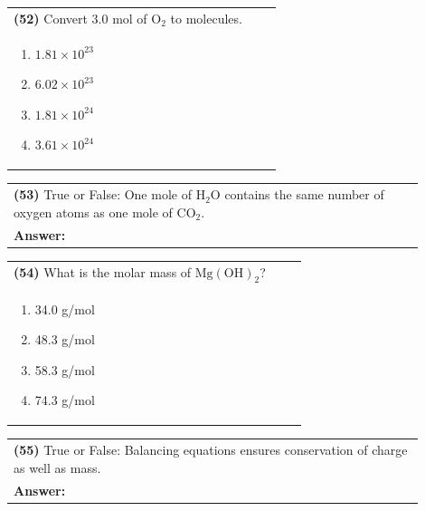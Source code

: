 \documentclass{article}
\begin{document}
\vspace{0.2cm}
\noindent \begin{tabular}{|p{0.9\linewidth}|}
\hline
\vspace{0.2cm}
\textbf{(52)} Convert 3.0 mol of $\mathrm{O_2}$ to molecules.\\
\begin{minipage}[t]{0.85\linewidth}
\begin{enumerate}[label=\alph*.]
\item $1.81\times10^{23}$
\item $6.02\times10^{23}$
\item $1.81\times10^{24}$
\item $3.61\times10^{24}$
\end{enumerate}
\end{minipage}\\
\hline
\end{tabular}
\newpage

\vspace{0.2cm}
\noindent \begin{tabular}{|p{0.9\linewidth}|}
\hline
\vspace{0.2cm}
\textbf{(53)} True or False: One mole of $\mathrm{H_2O}$ contains the same number of oxygen atoms as one mole of $\mathrm{CO_2}$.\\
\textbf{Answer:} \underline{\hspace{2cm}}\\
\hline
\end{tabular}

\vspace{0.2cm}
\noindent \begin{tabular}{|p{0.9\linewidth}|}
\hline
\vspace{0.2cm}
\textbf{(54)} What is the molar mass of $\mathrm{Mg(OH)_2}$?\\
\begin{minipage}[t]{0.85\linewidth}
\begin{enumerate}[label=\alph*.]
\item 34.0 g/mol
\item 48.3 g/mol
\item 58.3 g/mol
\item 74.3 g/mol
\end{enumerate}
\end{minipage}\\
\hline
\end{tabular}

\vspace{0.2cm}
\noindent \begin{tabular}{|p{0.9\linewidth}|}
\hline
\vspace{0.2cm}
\textbf{(55)} True or False: Balancing equations ensures conservation of charge as well as mass.\\
\textbf{Answer:} \underline{\hspace{2cm}}\\
\hline
\end{tabular}
\end{document}
